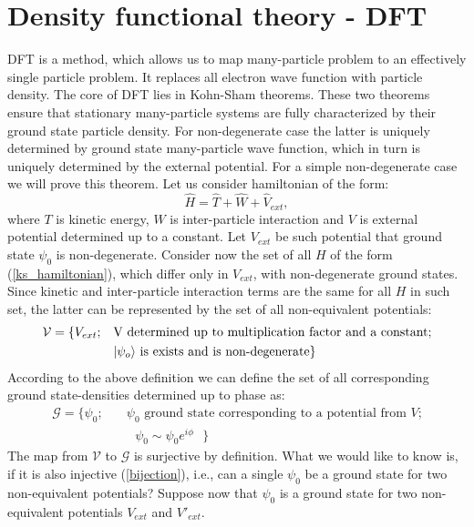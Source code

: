 \documentclass[openany, longbibliography,slovene,a4paper,12pt]{article}
\begin{document}
\section{Density functional theory - DFT}
DFT is a method, which allows us to map many-particle problem to an effectively
single particle problem. It replaces all electron wave function with
particle density.  The core of DFT lies in Kohn-Sham theorems. These two theorems
ensure that stationary many-particle systems are fully characterized by their
ground state particle density. For non-degenerate case the latter is uniquely determined
by ground state many-particle wave function, which in turn is uniquely determined by the
external potential. For a simple non-degenerate case we will prove this theorem.
Let us consider hamiltonian of the form:
\begin{equation} \label{ks_hamiltonian}
\hat H = \hat T + \hat W + \hat V_{ext},
\end{equation}
where $T$ is kinetic energy, $W$ is inter-particle interaction and $V$ is external
potential determined up to a constant. Let $V_{ext}$ be such potential that
ground state $\psi_0$ is non-degenerate. Consider now the set of all $H$ of the
form (\ref{ks_hamiltonian}), which differ only in $V_{ext}$, with non-degenerate
ground states. Since kinetic and inter-particle interaction terms are the same
for all $H$ in such set, the latter can be represented by the set of all non-equivalent potentials:
\begin{equation}
  \begin{split}
    \mathcal{V} = \{V_{ext};\quad &\textrm{V determined up to multiplication factor and a constant;}\\
    & \textrm{$\ket{\psi_o}$ is exists and is non-degenerate}\}
    \end{split}
 \end{equation}
According to the above definition we can define the set of all corresponding
ground state-densities determined up to phase as:
\begin{equation}
  \begin{split}
    \mathcal{G} = \{\psi_0; \quad &\textrm{$\psi_0$ ground state corresponding to a potential from $V$;}\\
&\textrm{ $\psi_0\sim\psi_0e^{i\phi}$   }
    \}
    \end{split}
  \end{equation}
The map from $\mathcal{V}$ to $\mathcal{G}$ is surjective by definition. What we
would like to know is, if it is also injective  (\ref{bijection}), i.e., can a single $\psi_0$ be a
ground state for two non-equivalent potentials? Suppose now that $\psi_0$ is a
ground state for two non-equivalent potentials $V_{ext}$ and $V'_{ext}$.
\end{document}
